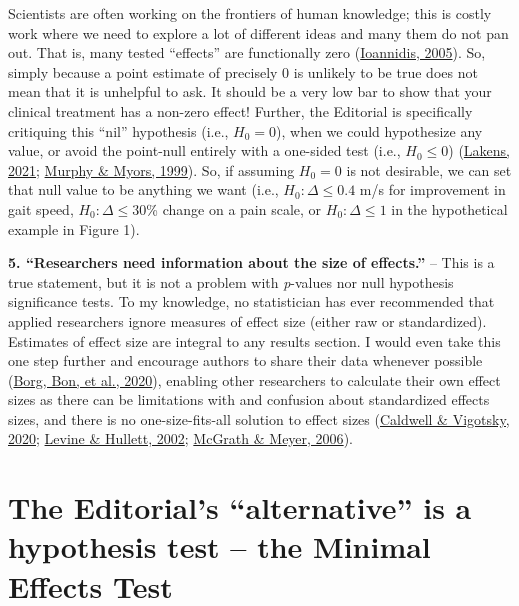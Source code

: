 \documentclass[]{cik}%
\begin{document}
Scientists are often working on the frontiers of human knowledge; this
is costly work where we need to explore a lot of different ideas and
many them do not pan out. That is, many tested ``effects'' are
functionally zero (\protect\hyperlink{ref-14}{Ioannidis, 2005}). So,
simply because a point estimate of precisely 0 is unlikely to be true
does not mean that it is unhelpful to ask. It should be a very low bar
to show that your clinical treatment has a non-zero effect! Further, the
Editorial is specifically critiquing this ``nil'' hypothesis (i.e.,
\(H_{0} = 0\)), when we could hypothesize any value, or avoid the
point-null entirely with a one-sided test (i.e., \(H_{0} \leq 0\))
(\protect\hyperlink{ref-5}{Lakens, 2021};
\protect\hyperlink{ref-2}{Murphy \& Myors, 1999}). So, if assuming
\(H_{0} = 0\) is not desirable, we can set that null value to be
anything we want (i.e., \(H_{0}: \Delta \leq 0.4\) m/s for improvement
in gait speed, \(H_{0}: \Delta \leq 30\)\% change on a pain scale, or
\(H_{0}: \Delta \leq 1\) in the hypothetical example in Figure 1).

\textbf{5. ``Researchers need information about the size of effects.''}
-- This is a true statement, but it is not a problem with
\emph{p}-values nor null hypothesis significance tests. To my knowledge,
no statistician has ever recommended that applied researchers ignore
measures of effect size (either raw or standardized). Estimates of
effect size are integral to any results section. I would even take this
one step further and encourage authors to share their data whenever
possible (\protect\hyperlink{ref-21}{Borg, Bon, et al., 2020}), enabling
other researchers to calculate their own effect sizes as there can be
limitations with and confusion about standardized effects sizes, and
there is no one-size-fits-all solution to effect sizes
(\protect\hyperlink{ref-22}{Caldwell \& Vigotsky, 2020};
\protect\hyperlink{ref-24}{Levine \& Hullett, 2002};
\protect\hyperlink{ref-23}{McGrath \& Meyer, 2006}).

\hypertarget{the-editorials-alternative-is-a-hypothesis-test-the-minimal-effects-test}{%
\section{The Editorial's ``alternative'' is a hypothesis test -- the
Minimal Effects
Test}\label{the-editorials-alternative-is-a-hypothesis-test-the-minimal-effects-test}}
\end{document}
